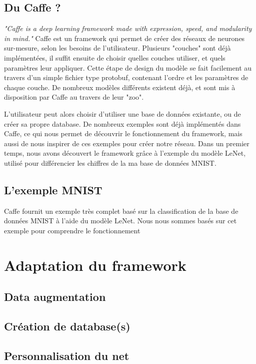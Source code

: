 \documentclass[a4paper,12pt]{article}
\begin{document}
  \subsection{Du Caffe ?}
    \textit{"Caffe is a deep learning framework made with expression, speed, and modularity in mind."}
    Caffe est un framework qui permet de créer des réseaux de neurones sur-mesure, selon les besoins de l'utilisateur. Plusieurs "couches" sont déjà implémentées, il suffit ensuite de choisir quelles couches utiliser, et quels paramètres leur appliquer. Cette étape de design du modèle se fait facilement au travers d'un simple fichier type protobuf, contenant l'ordre et les paramètres de chaque couche. De nombreux modèles différents existent déjà, et sont mis à disposition par Caffe au travers de leur "zoo".

    L'utilisateur peut alors choisir d'utiliser une base de données existante, ou de créer sa propre database. De nombreux exemples sont déjà implémentés dans Caffe, ce qui nous permet de découvrir le fonctionnement du framework, mais aussi de nous inspirer de ces exemples pour créer notre réseau. Dans un premier temps, nous avons découvert le framework grâce à l'exemple du modèle LeNet, utilisé pour différencier les chiffres de la ma base de données MNIST.
  
  \subsection{L'exemple MNIST}
    Caffe fournit un exemple très complet basé sur la classification de la base de données MNIST à l'aide du modèle LeNet. Nous nous sommes basés sur cet exemple pour comprendre le fonctionnement 

\newpage
\section{Adaptation du framework}
  
  \subsection{Data augmentation}
  
  \subsection{Création de database(s)}
  
  \subsection{Personnalisation du net}
\end{document}
